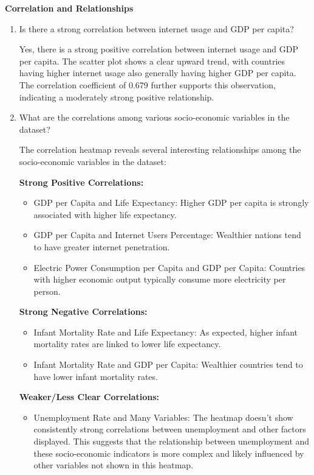 \documentclass{article}\usepackage[]{graphicx}\usepackage[]{xcolor}
\begin{document}
\textbf{Correlation and Relationships}

\begin{enumerate}
    \item Is there a strong correlation between internet usage and GDP per capita?
    
    Yes, there is a strong positive correlation between internet usage and GDP per capita. The scatter plot shows a clear upward trend, with countries having higher internet usage also generally having higher GDP per capita. The correlation coefficient of 0.679 further supports this observation, indicating a moderately strong positive relationship.
    
    \item What are the correlations among various socio-economic variables in the dataset?
    
    The correlation heatmap reveals several interesting relationships among the socio-economic variables in the dataset:
    
    \textbf{Strong Positive Correlations:}
  \begin{itemize}
\item{GDP per Capita and Life Expectancy: Higher GDP per capita is strongly associated with higher life expectancy.}
\item{GDP per Capita and Internet Users Percentage: Wealthier nations tend to have greater internet penetration.}
\item{Electric Power Consumption per Capita and GDP per Capita: Countries with higher economic output typically consume more electricity per person.}
\end{itemize}

\textbf{Strong Negative Correlations:}
  \begin{itemize}
\item{Infant Mortality Rate and Life Expectancy: As expected, higher infant mortality rates are linked to lower life expectancy.}
\item{Infant Mortality Rate and GDP per Capita: Wealthier countries tend to have lower infant mortality rates.}
\end{itemize}

\textbf{Weaker/Less Clear Correlations:}
  \begin{itemize}
\item{Unemployment Rate and Many Variables: The heatmap doesn't show consistently strong correlations between unemployment and other factors displayed. This suggests that the relationship between unemployment and these socio-economic indicators is more complex and likely influenced by other variables not shown in this heatmap.}
\end{itemize}
  
\end{enumerate}
\end{document}
